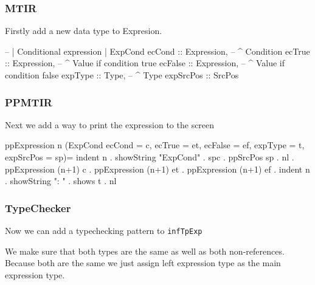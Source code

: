 \documentclass{article}
\begin{document}
\subsubsection{MTIR}
\begin{flushleft}
Firstly add a new data type to Expresion.
\end{flushleft}
\begin{code}
-- | Conditional expression
| ExpCond {
      ecCond    :: Expression,      -- ^ Condition
      ecTrue    :: Expression,      -- ^ Value if condition true
      ecFalse   :: Expression,      -- ^ Value if condition false
      expType    :: Type,           -- ^ Type
      expSrcPos :: SrcPos
  }
\end{code}


\subsubsection{PPMTIR}
\begin{flushleft}
Next we add a way to print the expression to the screen
\end{flushleft}
\begin{code}
ppExpression n (ExpCond {ecCond = c, ecTrue = et, ecFalse = ef, expType = t, expSrcPos = sp})=
    indent n . showString "ExpCond" . spc . ppSrcPos sp . nl
    . ppExpression (n+1) c
    . ppExpression (n+1) et
    . ppExpression (n+1) ef
    . indent n . showString ": " . shows t . nl
\end{code}

\subsubsection{TypeChecker}
\begin{flushleft}
Now we can add a typechecking pattern to \texttt{infTpExp}
\end{flushleft}
\begin{flushleft}
We make sure that both types are the same as well as both non-references. Because both are the same we just assign left expression type as the main expression type.
\end{flushleft}
\end{document}
